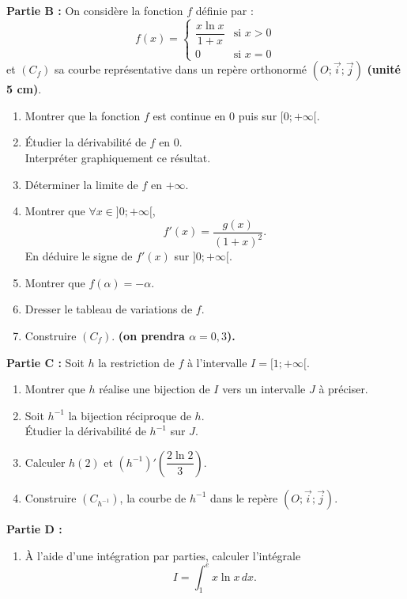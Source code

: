 \documentclass[12pt,a4paper]{article}
\begin{document}
\begin{multicols}{2}
\textbf{Partie B :} On considère la fonction \( f \) définie par :
\[
f(x) = 
\begin{cases}
\dfrac{x \ln x}{1 + x} & \text{si } x > 0 \\
0 & \text{si } x = 0
\end{cases}
\]
et \( (C_f) \) sa courbe représentative dans un repère orthonormé \( (O ; \vec{i} ; \vec{j}) \) \textbf{(unité 5 cm)}.

\begin{enumerate}
    \item Montrer que la fonction \( f \) est continue en 0 puis sur \( [0 ; +\infty[ \).
    \item Étudier la dérivabilité de \( f \) en 0.\\
    Interpréter graphiquement ce résultat.
    \item Déterminer la limite de \( f \) en \( +\infty \).
    \item Montrer que \( \forall x \in ]0 ; +\infty[ \),
    \[
    f'(x) = \dfrac{g(x)}{(1 + x)^2}.
    \]
    En déduire le signe de \( f'(x) \) sur \( ]0 ; +\infty[ \).
    \item Montrer que \( f(\alpha) = -\alpha \).
    \item Dresser le tableau de variations de \( f \).
    \item Construire \( (C_f) \). \textbf{(on prendra \( \alpha = 0{,}3 \)).}
\end{enumerate}
\textbf{Partie C :} Soit \( h \) la restriction de \( f \) à l’intervalle \( I = [1 ; +\infty[ \).

\begin{enumerate}
    \item Montrer que \( h \) réalise une bijection de \( I \) vers un intervalle \( J \) à préciser.
    \item Soit \( h^{-1} \) la bijection réciproque de \( h \).\\
    Étudier la dérivabilité de \( h^{-1} \) sur \( J \).
    \item Calculer \( h(2) \) et \( \left(h^{-1}\right)'\left( \dfrac{2 \ln 2}{3} \right) \).
    \item Construire \( (C_{h^{-1}}) \), la courbe de \( h^{-1} \) dans le repère \( (O ; \vec{i} ; \vec{j}) \).
\end{enumerate}

\vspace{1em}
\textbf{Partie D :}

\begin{enumerate}
    \item À l’aide d’une intégration par parties, calculer l’intégrale 
    \[
    I = \int_1^e x \ln x\,dx.
    \]


\end{enumerate}
\end{multicols}
\end{document}
